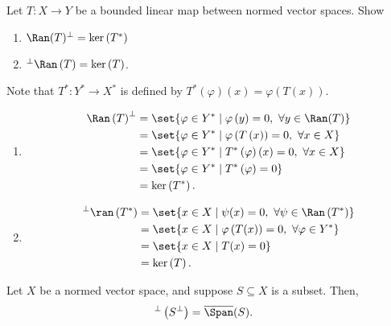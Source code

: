 \documentclass[10pt]{mypackage}
\begin{document}
  \begin{exercise}
    Let $T: X\rightarrow Y$ be a bounded linear map between normed vector spaces. Show
    \begin{enumerate}[(1)]
      \item $\Ran(T)^{\perp} = \ker\left(T^{\ast}\right)$
      \item $^{\perp}\Ran\left(T\right) = \ker\left(T\right)$.
    \end{enumerate}
  \end{exercise}
  \begin{solution}
    Note that $T^{\ast}: Y^{\ast}\rightarrow X^{\ast}$ is defined by $T^{\ast}\left(\varphi\right)(x) = \varphi\left(T(x)\right)$.
    \begin{enumerate}[(1)]
      \item 
        \begin{align*}
          \Ran\left(T\right)^{\perp} &= \set{\varphi\in Y^{\ast}\mid \varphi\left(y\right) = 0,~\forall y\in \Ran(T)}\\
                                     &= \set{\varphi\in Y^{\ast}\mid \varphi\left(T\left(x\right)\right) = 0,~\forall x\in X}\\
                                     &= \set{\varphi\in Y^{\ast}\mid T^{\ast}\left(\varphi\right)(x) = 0,~\forall x\in X}\\
                                     &= \set{\varphi\in Y^{\ast}\mid T^{\ast}\left(\varphi\right) = 0}\\
                                     &= \ker\left(T^{\ast}\right).
        \end{align*}
      \item 
        \begin{align*}
          ^{\perp}\ran\left(T^{\ast}\right) &= \set{x\in X\mid \psi(x) = 0,~\forall \psi\in \Ran\left(T^{\ast}\right)}\\
                                            &= \set{x\in X\mid \varphi\left(T(x)\right) = 0,~\forall \varphi\in Y^{\ast}}\\
                                            &= \set{x\in X\mid T(x) = 0}\\
                                            &= \ker\left(T\right).
        \end{align*}
    \end{enumerate}
  \end{solution}
  \begin{corollary}
    Let $X$ be a normed vector space, and suppose $S\subseteq X$ is a subset. Then,
    \begin{align*}
      ^{\perp}\left(S^{\perp}\right) &= \overline{\Span}(S).
    \end{align*}
  \end{corollary}
\end{document}
